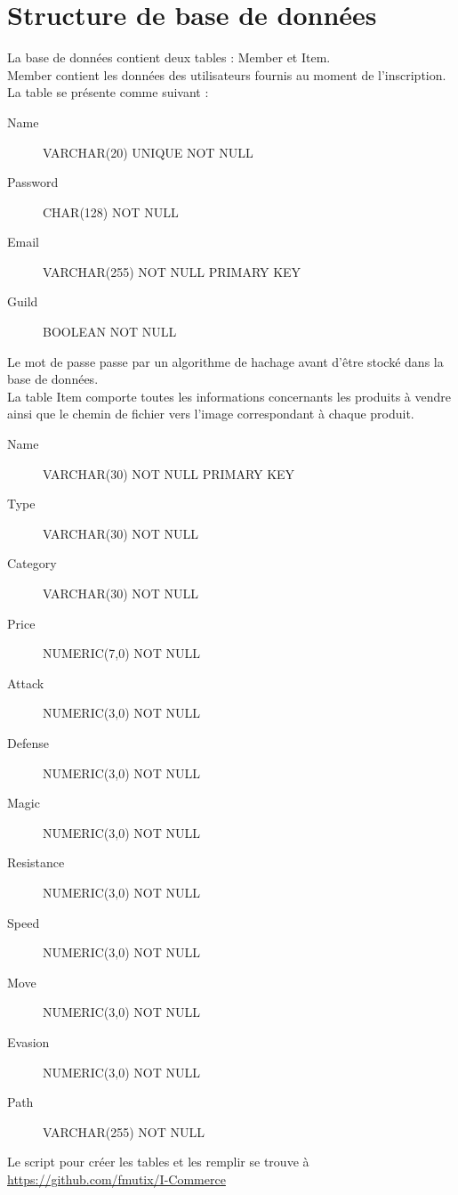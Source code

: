 \section{Structure de base de données}

La base de données contient deux tables : Member et Item. \\

Member contient les données des utilisateurs fournis au moment de l'inscription. 
La table se présente comme suivant :

\begin{description}
	\item[Name] VARCHAR(20) UNIQUE NOT NULL
	\item[Password] CHAR(128) NOT NULL
	\item[Email] VARCHAR(255) NOT NULL PRIMARY KEY
	\item[Guild] BOOLEAN NOT NULL
\end{description}

Le mot de passe passe par un algorithme de hachage avant d'être stocké dans 
la base de données. \\

La table Item comporte toutes les informations concernants les produits à 
vendre ainsi que le chemin de fichier vers l'image correspondant à chaque 
produit.

\begin{description}
	\item[Name] VARCHAR(30) NOT NULL PRIMARY KEY
	\item[Type] VARCHAR(30) NOT NULL
	\item[Category] VARCHAR(30) NOT NULL
	\item[Price] NUMERIC(7,0) NOT NULL
	\item[Attack] NUMERIC(3,0) NOT NULL
	\item[Defense] NUMERIC(3,0) NOT NULL
	\item[Magic] NUMERIC(3,0) NOT NULL
	\item[Resistance] NUMERIC(3,0) NOT NULL
	\item[Speed] NUMERIC(3,0) NOT NULL
	\item[Move] NUMERIC(3,0) NOT NULL
	\item[Evasion] NUMERIC(3,0) NOT NULL
	\item[Path] VARCHAR(255) NOT NULL
\end{description}

Le script pour créer les tables et les remplir se trouve à 
\href{https://github.com/fmutix/I-Commerce/tree/master/script}
{https://github.com/fmutix/I-Commerce}
